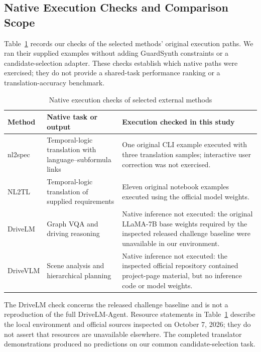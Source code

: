 \documentclass[nolineno]{ieeeaccess}
\begin{document}
\subsection{Native Execution Checks and Comparison Scope}\label{sec:external-checks}

Table~\ref{tab:external-execution} records our checks of the selected methods' original execution paths. We ran their supplied examples without adding GuardSynth constraints or a candidate-selection adapter. These checks establish which native paths were exercised; they do not provide a shared-task performance ranking or a translation-accuracy benchmark.\par

\begin{table}[tp]\caption{Native execution checks of selected external methods}\label{tab:external-execution}
\centering\fontsize{8}{10}\selectfont\setlength{\tabcolsep}{3pt}
\begin{tabular}{@{}>{\raggedright\arraybackslash}p{}>{\raggedright\arraybackslash}p{}>{\raggedright\arraybackslash}p{}@{}}
\toprule
\textbf{Method} & \textbf{Native task or output} & \textbf{Execution checked in this study}\\
\midrule
nl2spec \cite{r9} & Temporal-logic translation with language--subformula links & One original CLI example executed with three translation samples; interactive user correction was not exercised.\\[3pt]
NL2TL \cite{r8} & Temporal-logic translation of supplied requirements & Eleven original notebook examples executed using the official model weights.\\[3pt]
DriveLM \cite{r2} & Graph VQA and driving reasoning & Native inference not executed: the original LLaMA-7B base weights required by the inspected released challenge baseline were unavailable in our environment.\\[3pt]
DriveVLM \cite{r3} & Scene analysis and hierarchical planning & Native inference not executed: the inspected official repository contained project-page material, but no inference code or model weights.\\[3pt]
\bottomrule\end{tabular}
\end{table}

The DriveLM check concerns the released challenge baseline and is not a reproduction of the full DriveLM-Agent. Resource statements in Table~\ref{tab:external-execution} describe the local environment and official sources inspected on October 7, 2026; they do not assert that resources are unavailable elsewhere. The completed translator demonstrations produced no predictions on our common candidate-selection task.\par
\end{document}
